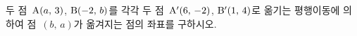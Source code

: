 두 점~$\mathrm{A}(a,\,3)$, $\mathrm{B}(-2,\,b)$를 각각 두 점~$\mathrm{A'}(6,\,-2)$, $\mathrm{B'}(1,\,4)$로 옮기는 평행이동에 의하여 점~$(b,\,a)$가 옮겨지는 점의 좌표를 구하시오.
